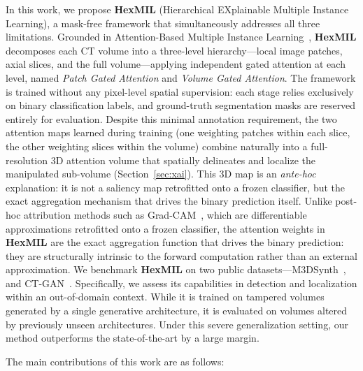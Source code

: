 \documentclass[sigconf, screen, review, anonymous]{acmart}
\begin{document}
In this work, we propose \textbf{HexMIL} (Hierarchical EXplainable Multiple Instance Learning), a mask-free framework that simultaneously addresses all three limitations. Grounded in Attention-Based Multiple Instance Learning~\cite{ilse2018attention}, \textbf{HexMIL} decomposes each CT volume into a three-level hierarchy---local image patches, axial slices, and the full volume---applying independent gated attention at each level, named \textit{Patch Gated Attention} and \textit{Volume Gated Attention}. The framework is trained without any pixel-level spatial supervision: each stage relies exclusively on binary classification labels, and ground-truth segmentation masks are reserved entirely for evaluation. Despite this minimal annotation requirement, the two attention maps learned during training (one weighting patches within each slice, the other weighting slices within the volume) combine naturally into a full-resolution 3D attention volume that spatially delineates and localize the manipulated sub-volume (Section~\ref{sec:xai}). This 3D map is an \emph{ante-hoc} explanation: it is not a saliency map retrofitted onto a frozen classifier, but the exact aggregation mechanism that drives the binary prediction itself. Unlike post-hoc attribution methods such as Grad-CAM~\cite{selvaraju2017grad}, which are differentiable approximations retrofitted onto a frozen classifier, the attention weights in \textbf{HexMIL} are the exact aggregation function that drives the binary prediction: they are structurally intrinsic to the forward computation rather than an external approximation.
We benchmark \textbf{HexMIL} on two public datasets---M3DSynth~\cite{zingarini2024m3dsynth}, and CT-GAN~\cite{mirsky2019ct}. Specifically, we assess its capabilities in detection and localization within an out-of-domain context. While it is trained on tampered volumes generated by a single generative architecture, it is evaluated on volumes altered by previously unseen architectures. Under this severe generalization setting, our method outperforms the state-of-the-art by a large margin.

\noindent The main contributions of this work are as follows:
\end{document}
